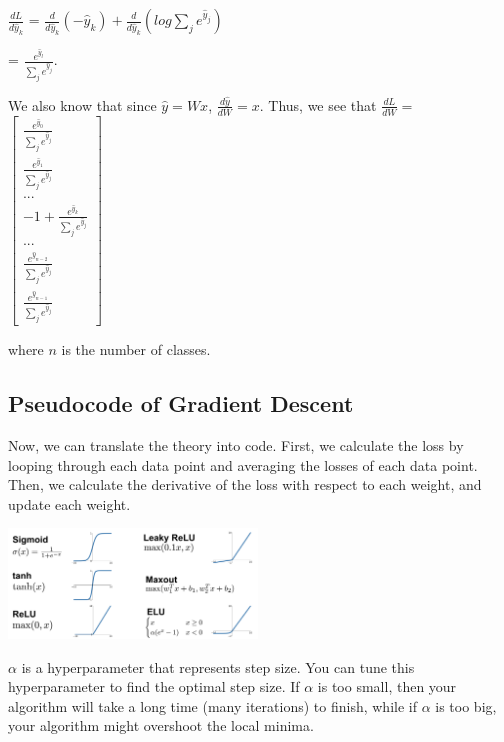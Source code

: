 \documentclass{article}
\begin{document}
$\frac{dL}{d\hat{y}_k}$ = $\frac{d}{d\hat{y}_k}(-\hat{y}_k) + \frac{d}{d\hat{y}_k}(log\sum_j e^{\hat{y}_j})$

= $\frac{e^{\hat{y}_l}}{\sum_j e^{\hat{y}_j}}$.

We also know that since $\hat{y} = Wx$, $\frac{d\hat{y}}{dW} = x.$ Thus, we see that $\frac{dL}{dW} = $
$
\begin{bmatrix} 
\frac{e^{\hat{y}_0}}{\sum_j e^{\hat{y}_j}} \\
\frac{e^{\hat{y}_1}}{\sum_j e^{\hat{y}_j}} \\
... \\
-1 + \frac{e^{\hat{y}_k}}{\sum_j e^{\hat{y}_j}} \\
... \\
\frac{e^{\hat{y}_{n-2}}}{\sum_j e^{\hat{y}_j}} \\
\frac{e^{\hat{y}_{n-1}}}{\sum_j e^{\hat{y}_j}}
\end{bmatrix}
$

where $n$ is the number of classes.

\subsection{Pseudocode of Gradient Descent}

Now, we can translate the theory into code. First, we calculate the loss by looping through each data point and averaging the losses of each data point. Then, we calculate the derivative of the loss with respect to each weight, and update each weight.

\includegraphics[width=250px]{activation_functions.png}

$\alpha$ is a hyperparameter that represents step size. You can tune this hyperparameter to find the optimal step size. If $\alpha$ is too small, then your algorithm will take a long time (many iterations) to finish, while if $\alpha$ is too big, your algorithm might overshoot the local minima.

\end{document}
